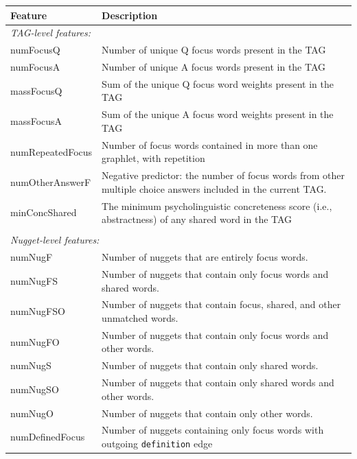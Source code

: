 \begin{table}[]
\footnotesize{
\begin{tabular}{p{35mm}p{105mm}}
\hline
Feature & Description \\
\hline
\multicolumn{2}{l}{\emph{TAG-level features:}} \\
numFocusQ			&	Number of unique Q focus words present in the TAG						\\
numFocusA			&	Number of unique A focus words present in the TAG						\\
massFocusQ			&	Sum of the unique Q focus word weights present in the TAG				\\
massFocusA			&	Sum of the unique A focus word weights present in the TAG				\\
numRepeatedFocus	&	Number of focus words contained in more than one graphlet, with repetition \\
numOtherAnswerF		&	Negative predictor: the number of focus words from other multiple choice answers included in the current TAG.	\\
minConcShared		&	The minimum psycholinguistic concreteness score (i.e., abstractness) of any shared word in the TAG \\
\\
\multicolumn{2}{l}{\emph{Nugget-level features: }} \\
numNugF				&	Number of nuggets that are entirely focus words. \\
numNugFS 			&	Number of nuggets that contain only focus words and shared words. \\
numNugFSO			&	Number of nuggets that contain focus, shared, and other unmatched words. \\
numNugFO			&	Number of nuggets that contain only focus words and other words. \\
numNugS				&	Number of nuggets that contain only shared words. \\
numNugSO			&	Number of nuggets that contain only shared words and other words. \\
numNugO				&	Number of nuggets that contain only other words. \\
numDefinedFocus		&	Number of nuggets containing only focus words with outgoing {\tt definition} edge \\

\end{tabular}}
\end{table}
